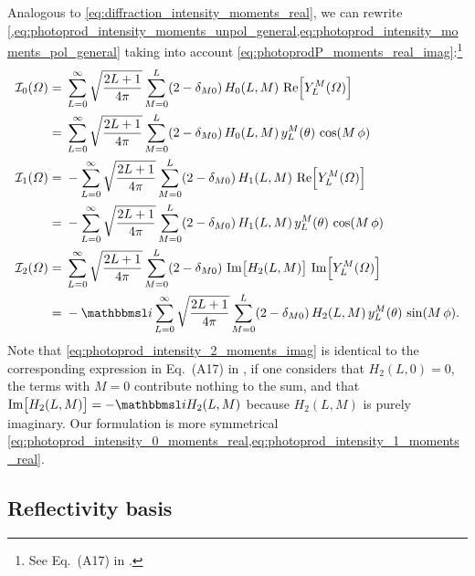 Analogous to \cref{eq:diffraction_intensity_moments_real}, we can
rewrite
\cref{,eq:photoprod_intensity_moments_unpol_general,eq:photoprod_intensity_moments_pol_general}
taking into account
\cref{eq:photoprodP_moments_real_imag}:\footnote{See Eq.~(A17) in
.}
\begin{align}
  \mathcal{I}_0(\Omega)
  ={}& \sum_{L = 0}^\infty \sqrt{\frac{2 L + 1}{4 \pi}} \sum_{M = 0}^{L} (2 - \delta_{M 0})\, H_0(L, M)\, \Re{Y_L^M(\Omega)} \notag
  \\
  \label{eq:photoprod_intensity_0_moments_real}
  ={}& \sum_{L = 0}^\infty \sqrt{\frac{2 L + 1}{4 \pi}} \sum_{M = 0}^{L} (2 - \delta_{M 0})\, H_0(L, M)\, y_L^M(\theta)\, \cos(M\, \phi)
  \\
  \mathcal{I}_1(\Omega)
  ={}& -\sum_{L = 0}^\infty \sqrt{\frac{2 L + 1}{4 \pi}} \sum_{M = 0}^{L} (2 - \delta_{M 0})\, H_1(L, M)\, \Re{Y_L^M(\Omega)} \notag
  \\
  \label{eq:photoprod_intensity_1_moments_real}
  ={}& -\sum_{L = 0}^\infty \sqrt{\frac{2 L + 1}{4 \pi}} \sum_{M = 0}^{L} (2 - \delta_{M 0})\, H_1(L, M)\, y_L^M(\theta)\, \cos(M\, \phi)
  \\
  \mathcal{I}_2(\Omega)
  ={}& \sum_{L = 0}^\infty \sqrt{\frac{2 L + 1}{4 \pi}} \sum_{M = 0}^{L} (2 - \delta_{M 0})\, \Im{H_2(L, M)}\, \Im{Y_L^M(\Omega)} \notag
  \\
  \label{eq:photoprod_intensity_2_moments_imag}
  ={}& -\imag \sum_{L = 0}^\infty \sqrt{\frac{2 L + 1}{4 \pi}} \sum_{M = 0}^{L} (2 - \delta_{M 0})\, H_2(L, M)\, y_L^M(\theta)\, \sin(M\, \phi).
\end{align}
Note that \cref{eq:photoprod_intensity_2_moments_imag} is identical to
the corresponding expression in Eq.~(A17) in
, if one considers that $H_2(L, 0) = 0$, \ie
the terms with $M = 0$ contribute nothing to the sum, and that
$\Im{H_2(L, M)} = -\imag H_2(L, M)$ because $H_2(L, M)$ is purely
imaginary.  Our formulation is more symmetrical \wrt
\cref{eq:photoprod_intensity_0_moments_real,eq:photoprod_intensity_1_moments_real}.


\subsection{Reflectivity basis}%
\label{sec:photoprod:reflectivity}

